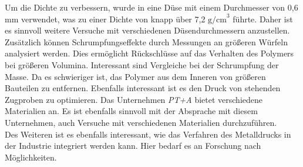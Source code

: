 Um die Dichte zu verbessern, wurde in \autocite{Quarto.2021} eine Düse mit einem Durchmesser von 0,6 mm verwendet, was zu einer Dichte von knapp über 7,2 \(\text{g/cm}^3\) führte. Daher ist es sinnvoll weitere Versuche mit verschiedenen Düsendurchmessern anzustellen. Zusätzlich können Schrumpfungseffekte durch Messungen an größeren Würfeln analysiert werden. Dies ermöglicht Rückschlüsse auf das Verhalten des Polymers bei größeren Volumina. Interessant sind Vergleiche bei der Schrumpfung der Masse. Da es schwieriger ist, das Polymer aus dem Inneren von größeren Bauteilen zu entfernen.
Ebenfalls interessant ist es den Druck von stehenden Zugproben zu optimieren. 
Das Unternehmen \textit{PT+A} bietet verschiedene Materialien an. Es ist ebenfalls sinnvoll mit der Absprache mit diesem Unternehmen, auch Versuche mit verschiedenen Materialien durchzuführen.\\
Des Weiteren ist es ebenfalls interessant, wie das Verfahren des Metalldrucks in der Industrie integriert werden kann. Hier bedarf es an Forschung nach Möglichkeiten.
\let\cleardoublepage\clearpage